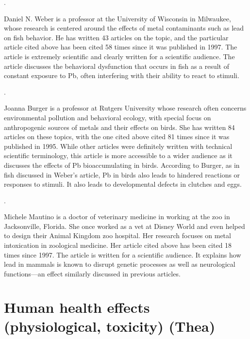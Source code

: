 \documentclass{article}
\begin{document}
\bigskip 

.
\bigskip

Daniel N. Weber is a professor at the University of Wisconsin in Milwaukee, whose research is centered around the effects of metal contaminants such as lead on fish behavior. He has written 43 articles on the topic, and the particular article cited above has been cited 58 times since it was published in 1997. The article is extremely scientific and clearly written for a scientific audience. The article discusses the behavioral dysfunction that occurs in fish as a result of constant exposure to Pb, often interfering with their ability to react to stimuli. 

\bigskip 

.

Joanna Burger is a professor at Rutgers University whose research often concerns environmental pollution and behavioral ecology, with special focus on anthropogenic sources of metals and their effects on birds. She has written 84 articles on these topics, with the one cited above cited 81 times since it was published in 1995. While other articles were definitely written with technical scientific terminology, this article is more accessible to a wider audience as it discusses the effects of Pb bioaccumulating in birds. According to Burger, as in fish discussed in Weber's article, Pb in birds also leads to hindered reactions or responses to stimuli. It also leads to developmental defects in clutches and eggs. 

\bigskip

.

\bigskip

Michele Mautino is a doctor of veterinary medicine in working at the zoo in Jacksonville, Florida. She once worked as a vet at Disney World and even helped to design their Animal Kingdom zoo hospital. Her research focuses on metal intoxication in zoological medicine. Her article cited above has been cited 18 times since 1997. The article is written for a scientific audience. It explains how lead in mammals is known to disrupt genetic processes as well as neurological functions—an effect similarly discussed in previous articles.

\section{Human health effects (physiological, toxicity) (Thea)}
\bigskip
\end{document}
